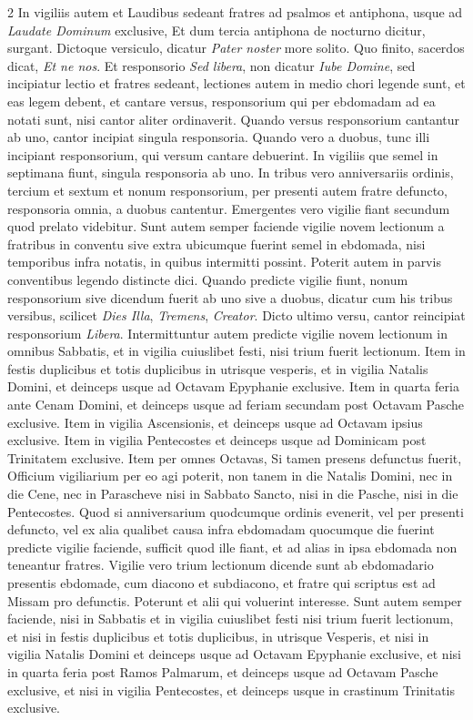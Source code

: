 \begin{multicols*}{2}
In vigiliis autem et Laudibus sedeant fratres ad psalmos et antiphona, usque ad \textit{Laudate Dominum} exclusive, Et dum tercia antiphona de nocturno dicitur, surgant. Dictoque versiculo, dicatur \textit{Pater noster} more solito. Quo finito, sacerdos dicat, \textit{Et ne nos}. Et responsorio \textit{Sed libera}, non dicatur \textit{Iube Domine}, sed incipiatur lectio et fratres sedeant, lectiones autem in medio chori legende sunt, et eas legem debent, et cantare versus, responsorium qui per ebdomadam ad ea notati sunt, nisi cantor aliter ordinaverit.
Quando versus responsorium cantantur ab uno, cantor incipiat singula responsoria. Quando vero a duobus, tunc illi incipiant responsorium, qui versum cantare debuerint. In vigiliis que semel in septimana fiunt, singula responsoria ab uno. In tribus vero anniversariis ordinis, tercium et sextum et nonum responsorium, per presenti autem fratre defuncto, responsoria omnia, a duobus cantentur. Emergentes vero vigilie fiant secundum quod prelato videbitur.
Sunt autem semper faciende vigilie novem lectionum a fratribus in conventu sive extra ubicumque fuerint semel in ebdomada, nisi temporibus infra notatis, in quibus intermitti possint. Poterit autem in parvis conventibus legendo distincte dici. Quando predicte vigilie fiunt, nonum responsorium sive dicendum fuerit ab uno sive a duobus, dicatur cum his tribus versibus, scilicet \textit{Dies Illa}, \textit{Tremens}, \textit{Creator}. Dicto ultimo versu, cantor reincipiat responsorium \textit{Libera}.
Intermittuntur autem predicte vigilie novem lectionum in omnibus Sabbatis, et in vigilia cuiuslibet festi, nisi trium fuerit lectionum. Item in festis duplicibus et totis duplicibus in utrisque vesperis, et in vigilia Natalis Domini, et deinceps usque ad Octavam Epyphanie exclusive. Item in quarta feria ante Cenam Domini, et deinceps usque ad feriam secundam post Octavam Pasche exclusive. Item in vigilia Ascensionis, et deinceps usque ad Octavam ipsius exclusive. Item in vigilia Pentecostes et deinceps usque ad Dominicam post Trinitatem exclusive. Item per omnes Octavas, Si tamen presens defunctus fuerit, Officium vigiliarium per eo agi poterit, non tanem in die Natalis Domini, nec in die Cene, nec in Parascheve nisi in Sabbato Sancto, nisi in die Pasche, nisi in die Pentecostes.
Quod si anniversarium quodcumque ordinis evenerit, vel per presenti defuncto, vel ex alia qualibet causa infra ebdomadam quocumque die fuerint predicte vigilie faciende, sufficit quod ille fiant, et ad alias in ipsa ebdomada non teneantur fratres.
Vigilie vero trium lectionum dicende sunt ab ebdomadario presentis ebdomade, cum diacono et subdiacono, et fratre qui scriptus est ad Missam pro defunctis. Poterunt et alii qui voluerint interesse. Sunt autem semper faciende, nisi in Sabbatis et in vigilia cuiuslibet festi nisi trium fuerit lectionum, et nisi in festis duplicibus et totis duplicibus, in utrisque Vesperis, et nisi in vigilia Natalis Domini et deinceps usque ad Octavam Epyphanie exclusive, et nisi in quarta feria post Ramos Palmarum, et deinceps usque ad Octavam Pasche exclusive, et nisi in vigilia Pentecostes, et deinceps usque in crastinum Trinitatis exclusive.

\end{multicols*}
